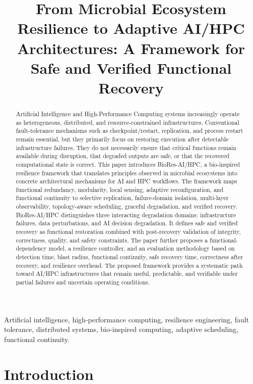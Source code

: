 \documentclass[conference]{IEEEtran}
\title{From Microbial Ecosystem Resilience to Adaptive AI/HPC Architectures: A Framework for Safe and Verified Functional Recovery}
\author{\IEEEauthorblockN{Dr. Patrick Lemoine}
\IEEEauthorblockA{Independent Researcher / HPC and AI Systems Engineer\\
Email: \texttt{[lemoine\_patrick@yahoo.ca]} \quad ORCID: \texttt{[0009-0008-9465-8159]}}}
\begin{document}
\maketitle

\begin{abstract}
Artificial Intelligence and High-Performance Computing systems increasingly operate as heterogeneous, distributed, and resource-constrained infrastructures. Conventional fault-tolerance mechanisms such as checkpoint/restart, replication, and process restart remain essential, but they primarily focus on restoring execution after detectable infrastructure failures. They do not necessarily ensure that critical functions remain available during disruption, that degraded outputs are safe, or that the recovered computational state is correct. This paper introduces BioRes-AI/HPC, a bio-inspired resilience framework that translates principles observed in microbial ecosystems into concrete architectural mechanisms for AI and HPC workflows. The framework maps functional redundancy, modularity, local sensing, adaptive reconfiguration, and functional continuity to selective replication, failure-domain isolation, multi-layer observability, topology-aware scheduling, graceful degradation, and verified recovery. BioRes-AI/HPC distinguishes three interacting degradation domains: infrastructure failures, data perturbations, and AI decision degradation. It defines safe and verified recovery as functional restoration combined with post-recovery validation of integrity, correctness, quality, and safety constraints. The paper further proposes a functional-dependency model, a resilience controller, and an evaluation methodology based on detection time, blast radius, functional continuity, safe recovery time, correctness after recovery, and resilience overhead. The proposed framework provides a systematic path toward AI/HPC infrastructures that remain useful, predictable, and verifiable under partial failures and uncertain operating conditions.
\end{abstract}

\begin{IEEEkeywords}
Artificial intelligence, high-performance computing, resilience engineering, fault tolerance, distributed systems, bio-inspired computing, adaptive scheduling, functional continuity.
\end{IEEEkeywords}

\section{Introduction}
\end{document}
